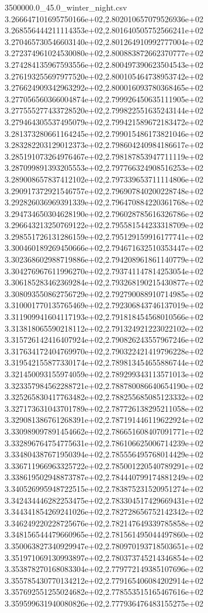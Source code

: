 \begin{filecontents*}{3500000.0_45.0_winter_night.csv}
3.266647101695750166e+02,2.802010657079526936e+02
3.268556444211114353e+02,2.801640505752566241e+02
3.270465730546603140e+02,2.801264910992777004e+02
3.272374961024530080e+02,2.800883872662370777e+02
3.274284135967593556e+02,2.800497390623504543e+02
3.276193255697977520e+02,2.800105464738953742e+02
3.276624909342963292e+02,2.800016093780368465e+02
3.277056560366004874e+02,2.799926450635111905e+02
3.277555277433728520e+02,2.799822551635243144e+02
3.279464305537495079e+02,2.799421589672183472e+02
3.281373280661164245e+02,2.799015486173821046e+02
3.283282203129012373e+02,2.798604240984186617e+02
3.285191073264976467e+02,2.798187853947711119e+02
3.287099891393205553e+02,2.797766324908516253e+02
3.289008657837412102e+02,2.797339653711114806e+02
3.290917372921546757e+02,2.796907840200228748e+02
3.292826036969391339e+02,2.796470884220361768e+02
3.294734650304628190e+02,2.796028785616326786e+02
3.296643213250769122e+02,2.795581544233318709e+02
3.298551726131286159e+02,2.795129159916177741e+02
3.300460189269450666e+02,2.794671632510353447e+02
3.302368602988719886e+02,2.794208961861140779e+02
3.304276967611996270e+02,2.793741147814253054e+02
3.306185283462369284e+02,2.793268190215430877e+02
3.308093550862756729e+02,2.792790088910714985e+02
3.310001770135765469e+02,2.792306843746137019e+02
3.311909941604117193e+02,2.791818454568010566e+02
3.313818065590218112e+02,2.791324921223022102e+02
3.315726142416407924e+02,2.790826243557967246e+02
3.317634172404769970e+02,2.790322421419796228e+02
3.319542155877330174e+02,2.789813454655886744e+02
3.321450093155974059e+02,2.789299343113571013e+02
3.323357984562288721e+02,2.788780086640654190e+02
3.325265830417763482e+02,2.788255685085123332e+02
3.327173631043701789e+02,2.787726138295211058e+02
3.329081386761268391e+02,2.787191446119622924e+02
3.330989097891454662e+02,2.786651608407091771e+02
3.332896764754775631e+02,2.786106625006714239e+02
3.334804387671950394e+02,2.785556495768014429e+02
3.336711966963325722e+02,2.785001220540789291e+02
3.338619502948873787e+02,2.784440799174881249e+02
3.340526995948722515e+02,2.783875231520951274e+02
3.342434446282253475e+02,2.783304517429669431e+02
3.344341854269241026e+02,2.782728656752142342e+02
3.346249220228725676e+02,2.782147649339785858e+02
3.348156544479660965e+02,2.781561495044497860e+02
3.350063827340929947e+02,2.780970193718503651e+02
3.351971069130993897e+02,2.780373745214346854e+02
3.353878270168083304e+02,2.779772149385107696e+02
3.355785430770134212e+02,2.779165406084202914e+02
3.357692551255024682e+02,2.778553515165467616e+02
3.359599631940080826e+02,2.777936476483155275e+02

\end{filecontents*}
